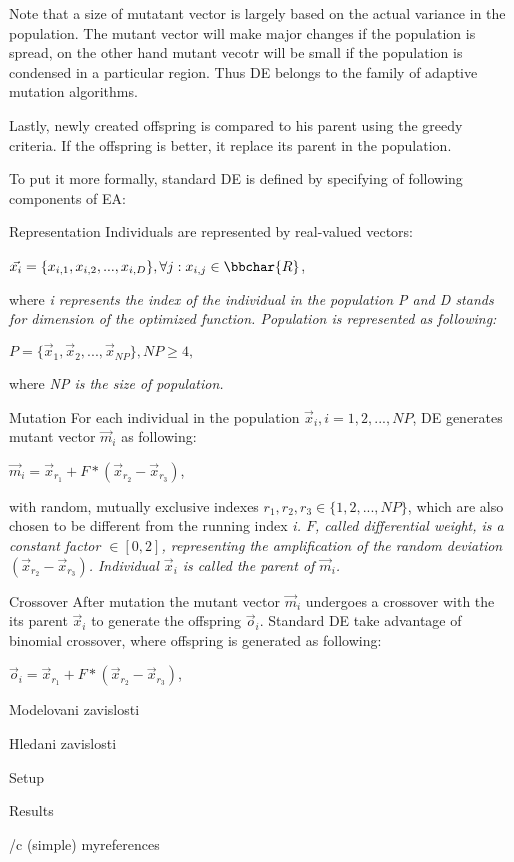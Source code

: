 Note that a size of mutatant vector is largely based on the actual variance in the
population. The mutant vector will make major changes if the population is spread, on
the other hand mutant vecotr will be small if the population is condensed in a
particular region. Thus DE belongs to the family of adaptive mutation algorithms.

Lastly, newly created offspring is compared to his parent using the greedy criteria.
If the offspring is better, it replace its parent in the population.

To put it more formally, standard DE is defined by specifying of following components of EA:


\secc Representation
Individuals are represented by real-valued vectors:
\medskip
\centerline{$\vec{x_i} = \{x_{i,1}, x_{i,2}, ..., x_{i,D}\},
\forall{j}: x_{i,j} \in{\bbchar{R}}$,}
\medskip
\noindent where \em i \em represents the index of the individual in the population \em P \em
and \em D \em stands for dimension of the optimized function. Population is represented as
following:
\medskip
\centerline{$P = \{\vec{x}_1, \vec{x}_2, ..., \vec{x}_{NP}\},NP \geq 4,$}
\medskip
\noindent where \em NP \em is the size of population.

\secc Mutation
For each individual in the population $\vec{x}_i, i = 1, 2, ..., NP$, DE generates mutant
vector $\vec{m}_i$ as following:
\medskip
\centerline{$\vec{m}_i = \vec{x}_{r_1} + F*(\vec{x}_{r_2} - \vec{x}_{r_3})$,}
\medskip
\noindent with random, mutually exclusive indexes $r_1, r_2, r_3 \in\{1, 2, ..., NP\}$,
which are also chosen to be different from the running index \em i\em. $F$, called 
\em differential weight\em, is a constant factor $\in [0, 2]$, representing the
amplification of the random deviation $(\vec{x}_{r_2} - \vec{x}_{r_3})$. Individual
$\vec{x}_i$ is called the parent of $\vec{m}_i$.

\secc Crossover
After mutation the mutant vector $\vec{m}_i$ undergoes a crossover with the its parent
$\vec{x}_i$ to generate the offspring $\vec{o}_i$. Standard DE take advantage of binomial
crossover, where offspring is generated as following:
\medskip
\centerline{$\vec{o}_i = \vec{x}_{r_1} + F*(\vec{x}_{r_2} - \vec{x}_{r_3})$,}
\medskip
\noindent















\chap Modelovani zavislosti

\chap Hledani zavislosti



\chap Setup

\chap Results

\bibchap
\usebib/c (simple) myreferences


\bye